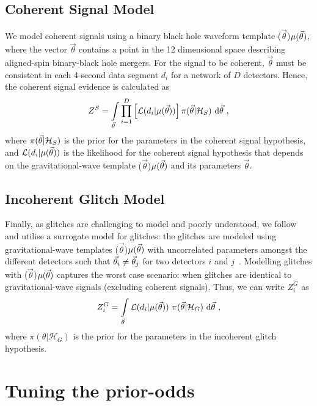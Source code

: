 \documentclass[%
 nofootinbib,
 amsmath,amssymb,
 aps,
 twocolumn,
 superscriptaddress
]{revtex4-2}
\newcommand{\mathcmd}[1]{{\sc \relax\ifmmode#1\else $#1$\fi}\xspace}
\newcommand{\parameters}{\mathcmd{\vec{\theta}}}
\newcommand{\template}{\mathcmd{\mu(\parameters)}}
\begin{document}
\subsection{Coherent Signal Model}
We model coherent signals using a binary black hole waveform template \template, where the vector \parameters contains a point in the 12 dimensional space describing aligned-spin binary-black hole mergers. For the signal to be coherent, \parameters must be consistent in each 4-second data segment $d_i$ for a network of $D$ detectors. Hence, the coherent signal evidence is calculated as
\begin{equation}
\label{eq:zs}
Z^S = \int\limits_{\parameters} \prod\limits^{D}_{i=1} \left[ \mathcal{L}(d_i|\template)\right] \pi(\parameters | \mathcal{H}_S)\  \text{d}\parameters \ ,
\end{equation}
where $\pi(\parameters| \mathcal{H}_S)$ is the prior for the parameters in the coherent signal hypothesis, and $\mathcal{L}(d_i|\template)$ is the likelihood for the coherent signal hypothesis that depends on the gravitational-wave template \template and its parameters \parameters. 

\subsection{Incoherent Glitch Model}
Finally, as glitches are challenging to model and poorly understood, we follow \citet{bci} and utilise a surrogate model for glitches: the glitches are modeled using gravitational-wave templates  \template with uncorrelated  parameters amongst the different detectors such that  $\parameters_i \neq \parameters_j$ for two detectors $i$ and $j$~\cite{bci}.  Modelling glitches with \template captures the worst case scenario: when glitches are identical to gravitational-wave signals (excluding coherent signals). Thus, we can write $Z^G_i$ as 
\begin{equation}
\label{eq:zg}
Z^G_i = \int\limits_{\parameters} \mathcal{L}(d_i|\template)\ \pi(\parameters| \mathcal{H}_G)\  \text{d}\parameters  \ ,
\end{equation}
where $\pi(\theta| \mathcal{H}_G)$ is the prior for the parameters in the incoherent glitch hypothesis. 



\section{Tuning the prior-odds}\label{sec:tuning-prior-odds}
\end{document}
